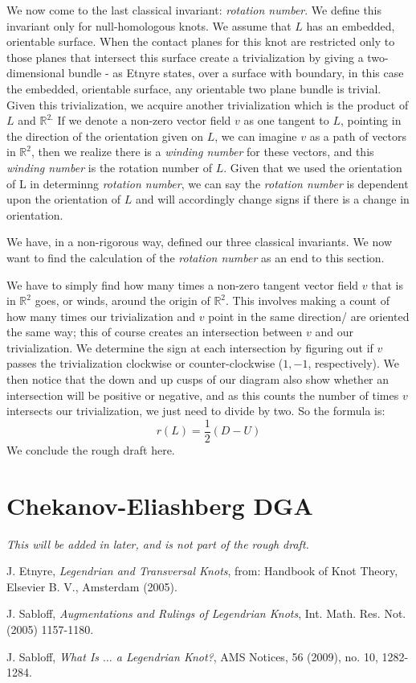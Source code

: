 \documentclass{article}
\begin{document}
We now come to the last classical invariant: \textit{rotation number}. We define 
this invariant only for null-homologous knots.
We assume that $L$ has an embedded, orientable surface. When the contact planes
for this knot are restricted only to those planes that intersect this surface create
a trivialization by giving a two-dimensional bundle - as Etnyre states, over a surface with boundary,
in this case the embedded, orientable surface, any orientable two plane bundle is trivial. Given this
trivialization, we acquire another trivialization which is the product of $L$ and $\mathbb{R}^{2.}$
If we denote a non-zero vector field $v$ as one tangent to $L$, pointing in the direction of the orientation given on $L$,
we can imagine $v$ as a path of vectors in $\mathbb{R}^{2}$, then we realize there is a \textit{winding number} for these vectors,
and this \textit{winding number} is the rotation number of $L.$ Given that we used the orientation of L in determinng \textit{rotation number},
we can say the \textit{rotation number} is dependent upon the orientation of $L$ and will accordingly change signs if there is a change in
orientation.

We have, in a non-rigorous way, defined our three classical invariants. We now want to find the calculation of the \textit{rotation number}
as an end to this section.

We have to simply find how many times a non-zero tangent vector field $v$ that is in $\mathbb{R}^{2}$ goes, or winds, around
the origin of $\mathbb{R}^{2}$. This involves making a count of how many times our trivialization and $v$ point in the same direction/
are oriented the same way; this of course creates an intersection between $v$ and our trivialization. We determine the sign
at each intersection by figuring out if $v$ passes the trivialization clockwise or counter-clockwise ($1, -1$, respectively).
We then notice that the down and up cusps of our diagram also show whether an intersection will be positive or negative,
and as this counts the number of times $v$ intersects our trivialization, we just need to divide by two.
So the formula is:
\[r(L) = \frac{1}{2}(D - U) \]
We conclude the rough draft here.
\section{Chekanov-Eliashberg DGA}

\textit{This will be added in later, and is not part of the rough draft.}


\begin{thebibliography}{9}
    J. Etnyre,
    \textit{Legendrian and Transversal Knots},
    from: Handbook of Knot Theory,
    Elsevier B. V.,
    Amsterdam (2005).

    J. Sabloff,
    \textit{Augmentations and Rulings of Legendrian Knots},
    Int. Math. Res. Not. (2005) 1157-1180.

    J. Sabloff,
    \textit{What Is $\ldots$ a Legendrian Knot?},
    AMS Notices, 56 (2009), no. 10, 1282-1284.
\end{thebibliography}
\end{document}
